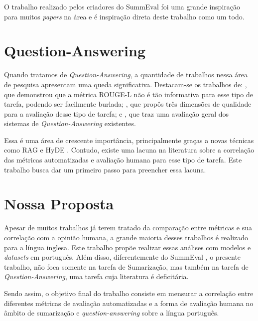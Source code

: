\documentclass[cic,tc]{iiufrgs}
\begin{document}
O trabalho realizado pelos criadores do SummEval \cite{fabbri2021summeval} foi uma grande inspiração para muitos \textit{papers} na área e é inspiração direta deste trabalho como um todo.

\section{Question-Answering}
Quando tratamos de \textit{Question-Answering}, a quantidade de trabalhos nessa área de pesquisa apresentam uma queda significativa. Destacam-se os trabalhos de: \citet{krishna-etal-2021-hurdles}, que demonstrou que a métrica ROUGE-L não é tão informativa para esse tipo de tarefa, podendo ser facilmente burlada; \citet{han-etal-2024-rag}, que propôs três dimensões de qualidade para a avaliação desse tipo de tarefa; e \citet{farea2025evaluation}, que traz uma avaliação geral dos sistemas de \textit{Question-Answering} existentes.

Essa é uma área de crescente importância, principalmente graças a novas técnicas como RAG \cite{lewis2020retrieval} e HyDE \cite{gao2023precise}. Contudo, existe uma lacuna na literatura sobre a correlação das métricas automatizadas e avaliação humana para esse tipo de tarefa. Este trabalho busca dar um primeiro passo para preencher essa lacuna.

\section{Nossa Proposta}
Apesar de muitos trabalhos já terem tratado da comparação entre métricas e sua correlação com a opinião humana, a grande maioria desses trabalhos é realizado para a língua inglesa. Este trabalho propõe realizar essas análises com modelos e \textit{datasets} em português. Além disso, diferentemente do SummEval \cite{fabbri2021summeval}, o presente trabalho, não foca somente na tarefa de Sumarização, mas também na tarefa de \textit{Question-Answering}, 
uma tarefa cuja literatura é deficitária.

Sendo assim, o objetivo final do trabalho consiste em mensurar a correlação entre diferentes métricas de avaliação automatizadas e a forma de avaliação humana no âmbito de sumarização e \textit{question-answering} sobre a língua português.
\end{document}
